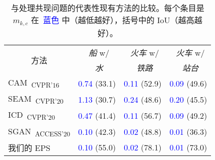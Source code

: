 \newcommand{\R}{\textcolor{red}}
\newcommand{\B}{\textcolor{blue}}

\begin{table}[]
\centering
{\small
\begin{tabular}{@{}llll@{}}
\toprule
\multicolumn{1}{c}{\multirow{2}{*}{方法}} & \multicolumn{1}{c}{~\emph{船} w/}   & \multicolumn{1}{c}{~\emph{火车} w/}  & \multicolumn{1}{c}{~\emph{火车} w/}  \\
& \multicolumn{1}{c}{~\emph{水}} & \multicolumn{1}{c}{~\emph{铁路}}          & \multicolumn{1}{c}{~\emph{站台}}  \\ \midrule
\multicolumn{1}{l}{CAM~\cite{zhou2016learning}\textsubscript{CVPR'16}}              & \B{0.74} (33.1)   & \B{0.11} (52.9)   & \multicolumn{1}{l}{\B{0.09} (49.6)}   \\
\multicolumn{1}{l}{SEAM~\cite{wang2020self}\textsubscript{CVPR'20}}                 & \B{1.13} (30.7)   & \B{0.24} (48.6)   & \multicolumn{1}{l}{\B{0.20} (45.5)}   \\
\multicolumn{1}{l}{ICD~\cite{fan2020learning}\textsubscript{CVPR'20}}               & \B{0.47} (41.4)   & \B{0.11} (56.7)   & \multicolumn{1}{l}{\B{0.09} (49.2)}   \\
\multicolumn{1}{l}{SGAN~\cite{yao2020saliency}\textsubscript{ACCESS'20}}            & \B{0.10} (42.3)   & \B{0.02} (48.8)   & \multicolumn{1}{l}{\B{0.01} (36.3)}   \\
\multicolumn{1}{l}{我们的 EPS}                                                         & \B{0.10} (55.0)   & \B{0.02} (78.1)   & \multicolumn{1}{l}{\B{0.01} (73.0)}   \\ \bottomrule
\end{tabular}
}
\vspace{2mm}
\caption{与处理共现问题的代表性现有方法的比较。每个条目是 {$m_{k,c}$} 在~\B{蓝色} 中（越低越好），括号中的 IoU（越高越好）。} \vspace{-2mm}
\label{tab:co_quantitative_v4}

\end{table}
